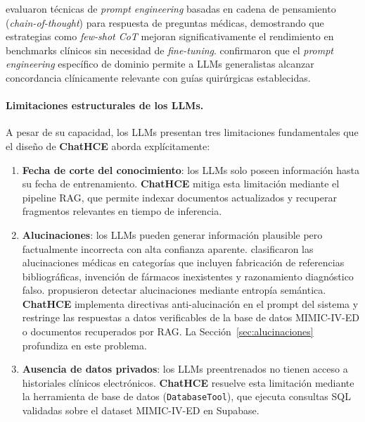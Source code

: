 \textcite{jeon2025cot} evaluaron técnicas de \textit{prompt engineering} basadas en cadena de pensamiento (\textit{chain-of-thought}) para respuesta de preguntas médicas, demostrando que estrategias como \textit{few-shot CoT} mejoran significativamente el rendimiento en benchmarks clínicos sin necesidad de \textit{fine-tuning}. \textcite{staple2025surgical} confirmaron que el \textit{prompt engineering} específico de dominio permite a \ac{LLM}s generalistas alcanzar concordancia clínicamente relevante con guías quirúrgicas establecidas.

\paragraph{Limitaciones estructurales de los \ac{LLM}s.}

A pesar de su capacidad, los \ac{LLM}s presentan tres limitaciones fundamentales que el diseño de \textbf{ChatHCE} aborda explícitamente:

\begin{enumerate}[nosep, leftmargin=*]
  \item \textbf{Fecha de corte del conocimiento}: los \ac{LLM}s solo poseen información hasta su fecha de entrenamiento. \textbf{ChatHCE} mitiga esta limitación mediante el pipeline \ac{RAG}, que permite indexar documentos actualizados y recuperar fragmentos relevantes en tiempo de inferencia.

  \item \textbf{Alucinaciones}: los \ac{LLM}s pueden generar información plausible pero factualmente incorrecta con alta confianza aparente. \textcite{kim2025hallucination} clasificaron las alucinaciones médicas en categorías que incluyen fabricación de referencias bibliográficas, invención de fármacos inexistentes y razonamiento diagnóstico falso. \textcite{farquhar2024semantic} propusieron detectar alucinaciones mediante entropía semántica. \textbf{ChatHCE} implementa directivas anti-alucinación en el prompt del sistema y restringe las respuestas a datos verificables de la base de datos \acs{MIMIC}-IV-\acs{ED} o documentos recuperados por \ac{RAG}. La Sección~\ref{sec:alucinaciones} profundiza en este problema.

  \item \textbf{Ausencia de datos privados}: los \ac{LLM}s preentrenados no tienen acceso a historiales clínicos electrónicos. \textbf{ChatHCE} resuelve esta limitación mediante la herramienta de base de datos (\texttt{DatabaseTool}), que ejecuta consultas \ac{SQL} validadas sobre el dataset \acs{MIMIC}-IV-\acs{ED} en Supabase.
\end{enumerate}


